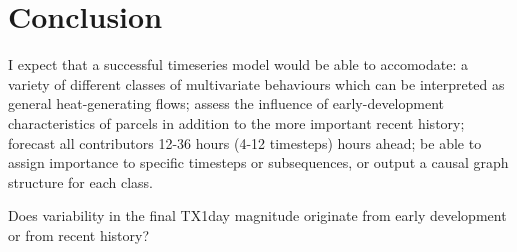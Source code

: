 \documentclass[11pt,a4paper,twoside,openright]{report}
\theoremstyle{definition}
\begin{document}
\chapter{Conclusion}\label{conclusion-1}

I expect that a successful timeseries model would be able to accomodate: a variety of different classes of multivariate behaviours which can be interpreted as general heat-generating flows; assess the influence of early-development characteristics of parcels in addition to the more important recent history; forecast all contributors 12-36 hours (4-12 timesteps) hours ahead; be able to assign importance to specific timesteps or subsequences, or output a causal graph structure for each class.

Does variability in the final TX1day magnitude originate from early development or from recent history?
\cleardoublepage
{}




\appendix



\cleardoublepage

\end{document}
